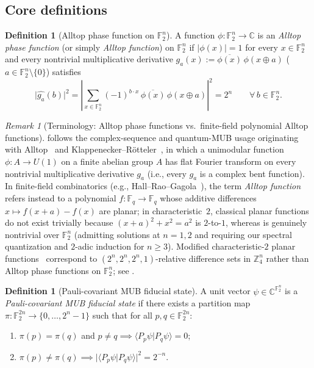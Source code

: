 \documentclass[11pt,a4paper]{article}
\theoremstyle{plain}
\theoremstyle{definition}
\newtheorem{definition}[lemma]{Definition}
\theoremstyle{remark}
\newtheorem{remark}[lemma]{Remark}
\newcommand{\C}{\mathbb{C}}
\newcommand{\Z}{\mathbb{Z}}
\newcommand{\F}{\mathbb{F}}
\newcommand{\Uone}{U(1)}
\newcommand{\braket}[2]{\langle#1|#2\rangle}
\newcommand{\abs}[1]{\lvert#1\rvert}
\numberwithin{equation}{section}
\begin{document}
\subsection{Core definitions}

\begin{definition}[Alltop phase function on $\F_2^n$]\label{def:alltop}
A function $\phi : \F_2^n \to \C$ is an \emph{Alltop phase function} (or simply \emph{Alltop function}) on $\F_2^n$ if $\abs{\phi(x)} = 1$ for every $x \in \F_2^n$ and every nontrivial multiplicative derivative $g_a(x) := \overline{\phi(x)}\,\phi(x \oplus a)$ ($a \in \F_2^n \setminus \{0\}$) satisfies
\[
  \abs{\widehat{g_a}(b)}^2 = \left\lvert \sum_{x \in \F_2^n} (-1)^{b \cdot x}\,\overline{\phi(x)}\,\phi(x \oplus a) \right\rvert^2 = 2^n \qquad \forall\, b \in \F_2^n.
\]
\end{definition}

\begin{remark}[Terminology: Alltop phase functions vs.\ finite-field polynomial Alltop functions]\label{rem:alltop-terminology}
 follows the complex-sequence and quantum-MUB usage originating with Alltop~\cite{alltop1980complex} and Klappenecker--R\"otteler~\cite{klappenecker2004constructions}, in which a unimodular function $\phi : A \to \Uone$ on a finite abelian group $A$ has flat Fourier transform on every nontrivial multiplicative derivative $g_a$ (i.e., every $g_a$ is a complex bent function). In finite-field combinatorics (e.g., Hall--Rao--Gagola~\cite{hall2013family}), the term \emph{Alltop function} refers instead to a polynomial $f : \F_q \to \F_q$ whose additive differences $x \mapsto f(x+a) - f(x)$ are planar; in characteristic~$2$, classical planar functions do not exist trivially because $(x+a)^2 + x^2 = a^2$ is $2$-to-$1$, whereas  is genuinely nontrivial over $\F_2^n$ (admitting solutions at $n = 1, 2$ and requiring our spectral quantization and $2$-adic induction for $n \ge 3$). Modified characteristic-$2$ planar functions~\cite{zhou2013relative,schmidt2014planar,abdukhalikov2015symplectic} correspond to $(2^n, 2^n, 2^n, 1)$-relative difference sets in $\Z_4^n$ rather than Alltop phase functions on $\F_2^n$; see .
\end{remark}

\begin{definition}[Pauli-covariant MUB fiducial state]\label{def:pauli-mub}
A unit vector $\psi \in \C^{\F_2^n}$ is a \emph{Pauli-covariant MUB fiducial state} if there exists a partition map $\pi : \F_2^{2n} \to \{0, \dots, 2^n - 1\}$ such that for all $p, q \in \F_2^{2n}$:
\begin{enumerate}[label=(\roman*),leftmargin=2em]
  \item $\pi(p) = \pi(q)$ and $p \neq q \implies \braket{P_p \psi}{P_q \psi} = 0$;
  \item $\pi(p) \neq \pi(q) \implies \abs{\braket{P_p \psi}{P_q \psi}}^2 = 2^{-n}$.
\end{enumerate}
\end{definition}
\end{document}
